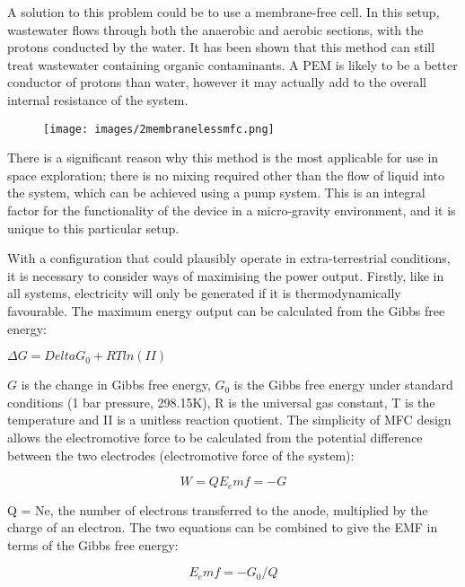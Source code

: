 \documentclass[12pt]{article}
\begin{document}
A solution to this problem could be to use a membrane-free cell. In this setup, wastewater flows through both the anaerobic and aerobic sections, with the protons conducted by the water. It has been shown that this method can still treat wastewater containing organic contaminants. A PEM is likely to be a better conductor of protons than water, however it may actually add to the overall internal resistance of the system. \cite{ghangrekar2006wastewater,logan2005simultaneous}

\begin{figure}
\centering
\texttt{[image: images/2membranelessmfc.png]}
\caption{\cite{ghangrekar2007performance}}
\label{fig:2membranelessmfc}
\end{figure}

There is a significant reason why this method is the most applicable for use in space exploration; there is no mixing required other than the flow of liquid into the system, which can be achieved using a pump system. This is an integral factor for the functionality of the device in a micro-gravity environment, and it is unique to this particular setup. \cite{min2004continuous}

With a configuration that could plausibly operate in extra-terrestrial conditions, it is necessary to consider ways of maximising the power output. Firstly, like in all systems, electricity will only be generated if it is thermodynamically favourable.  The maximum energy output can be calculated from the Gibbs free energy:

$\Delta G = Delta G_0 + RT ln(II)$

$G$ is the change in Gibbs free energy, $G_{0}$ is the Gibbs free energy under standard conditions (1 bar pressure, 298.15K), R is the universal gas constant, T is the temperature and II is a unitless reaction quotient. The simplicity of MFC design allows the electromotive force to be calculated from the potential difference between the two electrodes (electromotive force of the system): 

\begin{equation}
W=Q E_emf = -G
\end{equation}


Q = Ne, the number of electrons transferred to the anode, multiplied by the charge of an electron. The two equations can be combined to give the EMF in terms of the Gibbs free energy:

\begin{equation}
E_emf = - G_0 / Q
\end{equation}
\end{document}
